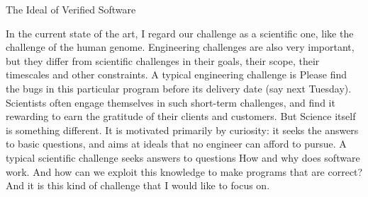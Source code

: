 The Ideal of Verified Software

In the current state of the art, I regard our challenge as a scientific
one, like the challenge of the human genome. Engineering challenges are
also very important, but they differ from scientific challenges in their
goals, their scope, their timescales and other constraints. A typical
engineering challenge is Please find the bugs in this particular program
before its delivery date (say next Tuesday). Scientists often engage
themselves in such short-term challenges, and find it rewarding to earn
the gratitude of their clients and customers. But Science itself is
something different. It is motivated primarily by curiosity: it seeks
the answers to basic questions, and aims at ideals that no engineer can
afford to pursue. A typical scientific challenge seeks answers to
questions How and why does software work. And how can we exploit this
knowledge to make programs that are correct? And it is this kind of
challenge that I would like to focus on.